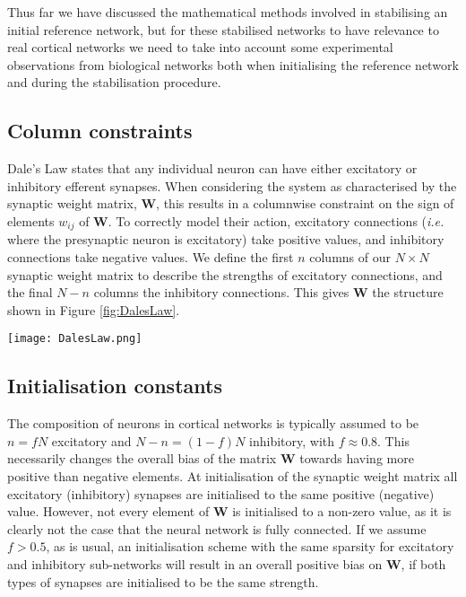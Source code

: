 \documentclass[12pt, a4paper]{article}
\begin{document}
Thus far we have discussed the mathematical methods involved in stabilising an initial reference network, but for these stabilised networks to have relevance to real cortical networks we need to take into account some experimental observations from biological networks both when initialising the reference network and during the stabilisation procedure.  

\subsection{Column constraints}
Dale's Law states that any individual neuron can have either excitatory or inhibitory efferent synapses.  When considering the system as characterised by the synaptic weight matrix, $\mathbf{W}$, this results in a columnwise constraint on the sign of elements $w_{ij}$ of $\mathbf{W}$.  To correctly model their action, excitatory connections (\emph{i.e.} where the presynaptic neuron is excitatory) take positive values, and inhibitory connections take negative values.  We define the first $n$ columns of our $N \times N$ synaptic weight matrix to describe the strengths of excitatory connections, and the final $N-n$ columns the inhibitory connections.  This gives $\mathbf{W}$ the structure shown in Figure \ref{fig:DalesLaw}.

\begin{SCfigure}[][h]
        \centering
        \texttt{[image: DalesLaw.png]}
        \caption{By organising the excitatory and inhibitory connections by column, and applying Dale's Law, we obtain weight matrices with this structure. Elements in the blue section are $\geq 0$ and those in the red section are $\leq 0$. (Note: Notation of the form E$\rightarrow$E will be used throughout this report.)}
        \label{fig:DalesLaw}
\end{SCfigure}
\FloatBarrier

\pagebreak
\subsection{Initialisation constants}
\label{sec:initConst}
The composition of neurons in cortical networks is typically assumed to be $n = fN$ excitatory and $ N - n = (1-f)N$ inhibitory, with $f\approx 0.8$.  This necessarily changes the overall bias of the matrix $\mathbf{W}$ towards having more positive than negative elements.  At initialisation of the synaptic weight matrix all excitatory (inhibitory) synapses are initialised to the same positive (negative) value.  However, not every element of $\mathbf{W}$ is initialised to a non-zero value, as it is clearly not the case that the neural network is fully connected.  If we assume $f > 0.5$, as is usual, an initialisation scheme with the same sparsity for excitatory and inhibitory sub-networks will result in an overall positive bias on $\mathbf{W}$, if both types of synapses are initialised to be the same strength.
\end{document}
